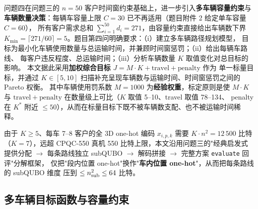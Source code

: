 \documentclass[UTF8,12pt,a4paper]{ctexart}
\begin{document}
问题四在问题三的 $n=50$ 客户时间窗约束基础上，进一步引入\textbf{多车辆容量约束}与
\textbf{车辆数量决策}：每辆车容量上限 $C=30$ 已不再适用（题目附件 2 给定单车容量 $C=60$），
所有客户需求总和 $\sum_{i=1}^{50}d_i=271$，由容量约束直接给出车辆数下界
$K_{\min}=\lceil 271/60\rceil=5$。题目第四问明确要求：（i）建立多车辆路径规划模型，
目标为最小化车辆使用数量与总运输时间，并兼顾时间窗惩罚；（ii）给出每辆车路线、
每客户违反程度、总运输时间；（iii）分析车辆数量 $K$ 取值变化对总目标的影响。
本文据此采用\textbf{加权综合目标 $J=M\!\cdot\!K+\mathrm{travel}+\mathrm{penalty}$} 作为
单一标量目标，并通过 $K\in[5,10]$ 扫描补充呈现车辆数与运输时间、时间窗惩罚之间的 Pareto 权衡。
其中车辆使用罚系数 $M=1000$ 为\textbf{经验权重}，标定原则是使 $M\!\cdot\!K$ 与
$\mathrm{travel}+\mathrm{penalty}$ 在数量级上可比（$K$ 取值 5--10、travel 取值 78--134、
penalty 在 $K^*$ 附近 $\le 50$），从而在标量目标下既不被车辆数支配、也不被运输时间稀释。

由于 $K\ge 5$、每车 7--8 客户的全 3D one-hot 编码 $x_{i,p,k}$ 需要 $K\!\cdot\!n^2=12\,500$
比特（$K=7$），远超 CPQC-550 真机 550 比特上限，本文沿用问题三的"经典启发式提供分配 $\to$
每条路线独立 subQUBO $\to$ 解码拼接 $\to$ 完整方案 \texttt{evaluate} 回评"分解框架，
仅把"段内位置 one-hot"换作"\textbf{车内位置 one-hot}"，从而把每条路线的 subQUBO 维度
压到 $\le n_{\rm sub}^2\le 64$ 比特。

\subsection{多车辆目标函数与容量约束}
\label{subsec:q4-model}
\end{document}
